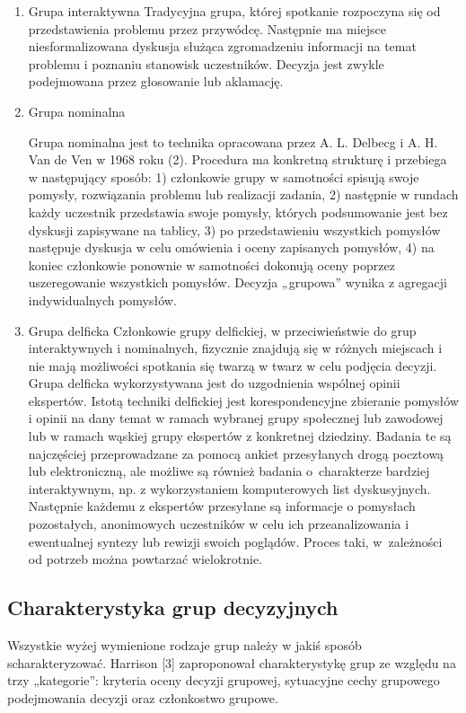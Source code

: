 \begin{enumerate}[1)]
  \item Grupa interaktywna
  Tradycyjna grupa, której spotkanie rozpoczyna się od przedstawienia problemu przez 
  przywódcę. Następnie ma miejsce niesformalizowana dyskusja służąca zgromadzeniu 
  informacji na temat problemu i poznaniu stanowisk uczestników. Decyzja jest zwykle 
  podejmowana przez głosowanie lub aklamację.

  \item Grupa nominalna
  
  Grupa nominalna jest to technika opracowana przez A. L. Delbecg i A. H. Van de Ven w 1968 roku (2). 
  Procedura ma konkretną strukturę i przebiega w następujący sposób: 1) członkowie grupy w samotności 
  spisują swoje pomysły, rozwiązania problemu lub realizacji zadania, 2) następnie w rundach 
  każdy uczestnik przedstawia swoje pomysły, których podsumowanie jest bez dyskusji zapisywane 
  na tablicy, 3) po przedstawieniu wszystkich pomysłów następuje dyskusja w celu omówienia i oceny 
  zapisanych pomysłów, 4) na koniec członkowie ponownie w samotności dokonują oceny 
  poprzez uszeregowanie wszystkich pomysłów. Decyzja „grupowa” wynika z agregacji indywidualnych pomysłów.

  \item Grupa delficka
  Członkowie grupy delfickiej, w przeciwieństwie do grup
  interaktywnych i nominalnych, fizycznie znajdują się w różnych miejscach i
  nie mają możliwości spotkania się twarzą w twarz w celu podjęcia decyzji.
  Grupa delficka wykorzystywana jest do uzgodnienia wspólnej opinii ekspertów. 
  Istotą techniki delfickiej jest korespondencyjne zbieranie pomysłów i opinii 
  na dany temat w ramach wybranej grupy społecznej lub zawodowej lub w ramach 
  wąskiej grupy ekspertów z konkretnej dziedziny. Badania te są najczęściej 
  przeprowadzane za pomocą ankiet przesyłanych drogą pocztową lub elektroniczną,
  ale możliwe są również badania o charakterze bardziej interaktywnym, np.
  z wykorzystaniem  komputerowych list dyskusyjnych. Następnie każdemu z
  ekspertów przesyłane są informacje o pomysłach pozostałych, anonimowych 
  uczestników w celu ich przeanalizowania i ewentualnej syntezy lub rewizji 
  swoich poglądów. Proces taki, w zależności od potrzeb można powtarzać 
  wielokrotnie.

\end{enumerate}


\subsection{Charakterystyka grup decyzyjnych}
Wszystkie wyżej wymienione rodzaje grup należy w jakiś sposób scharakteryzować. 
Harrison [3] zaproponował charakterystykę grup ze względu na trzy „kategorie”: 
kryteria oceny decyzji grupowej, sytuacyjne cechy grupowego podejmowania decyzji oraz członkostwo grupowe.


